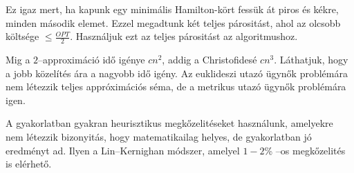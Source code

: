Ez igaz mert, ha kapunk egy minimális Hamilton-kört fessük át piros és kékre,
minden második elemet. Ezzel megadtunk két teljes párositást, ahol az olcsobb
költsége $\leq \frac{OPT}{2}$. Használjuk ezt az teljes párositást az
algoritmushoz.

Mig a $2$--approximáció idő igénye $cn^2$, addig a Christofidesé $cn^3$.
Láthatjuk, hogy a jobb közelítés ára a nagyobb idő igény. Az euklideszi utazó
ügynők problémára nem létezzik teljes appróximációs séma, de a metrikus utazó
ügynők problémára igen.

A gyakorlatban gyakran heurisztikus megkőzelitéseket használunk, amelyekre nem
létezzik bizonyitás, hogy matematikailag helyes, de gyakorlatban jó eredményt
ad. Ilyen a Lin--Kernighan módszer, amelyel $1-2$\% --os megkőzelités is
elérhető.
